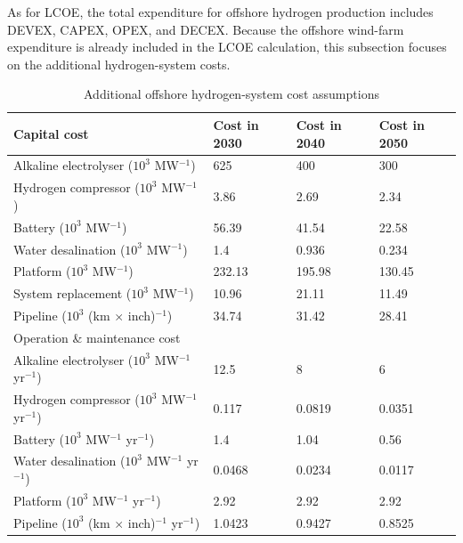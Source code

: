 \documentclass[sn-mathphys,Numbered]{sn-jnl}%
\theoremstyle{plain}%
\theoremstyle{definition}%
\theoremstyle{remark}%
\begin{document}
As for LCOE, the total expenditure for offshore hydrogen production includes DEVEX, CAPEX, OPEX, and DECEX. Because the offshore wind-farm expenditure is already included in the LCOE calculation, this subsection focuses on the additional hydrogen-system costs.

\begin{table}[tbp]
\centering
\caption{Additional offshore hydrogen-system cost assumptions \cite{OffshoreWindandHydrogen, Offshorewindtogreen}}
\label{tab offshore hydrogen system cost}
\begin{tabular}{llll}
\hline
Capital cost                                                                                                    & Cost in 2030 & Cost in 2040 & Cost in 2050 \\ \hline
Alkaline electrolyser ($10^3$ \texteuro{} MW$^{-1}$)                       & 625          & 400          & 300          \\
Hydrogen compressor ($10^3$ \texteuro{} MW$^{-1}$)                         & 3.86         & 2.69         & 2.34         \\
Battery ($10^3$ \texteuro{} MW$^{-1}$)                                       & 56.39        & 41.54        & 22.58        \\
Water desalination ($10^3$ \texteuro{} MW$^{-1}$)                            & 1.4          & 0.936        & 0.234        \\
Platform ($10^3$ \texteuro{} MW$^{-1}$)                                      & 232.13       & 195.98       & 130.45       \\
System replacement ($10^3$ \texteuro{} MW$^{-1}$)                            & 10.96        & 21.11        & 11.49        \\
Pipeline ($10^3$ \texteuro{} (km $\times$ inch)$^{-1}$)       & 34.74        & 31.42        & 28.41        \\ \hline
\multicolumn{2}{l}{Operation   \& maintenance cost}                                                                               &              &              \\ \hline
Alkaline electrolyser ($10^3$ \texteuro{} MW$^{-1}$ yr$^{-1}$)                  & 12.5         & 8            & 6            \\
Hydrogen compressor ($10^3$ \texteuro{} MW$^{-1}$ yr$^{-1}$)                   & 0.117        & 0.0819       & 0.0351       \\
Battery ($10^3$ \texteuro{} MW$^{-1}$ yr$^{-1}$)                                 & 1.4          & 1.04         & 0.56         \\
Water desalination ($10^3$ \texteuro{} MW$^{-1}$ yr$^{-1}$)                    & 0.0468       & 0.0234       & 0.0117       \\
Platform ($10^3$ \texteuro{} MW$^{-1}$ yr$^{-1}$)                                & 2.92         & 2.92         & 2.92         \\
Pipeline ($10^3$ \texteuro{} (km $\times$ inch)$^{-1}$ yr$^{-1}$) & 1.0423       & 0.9427       & 0.8525       \\ \hline
\end{tabular}
\end{table}
\end{document}
